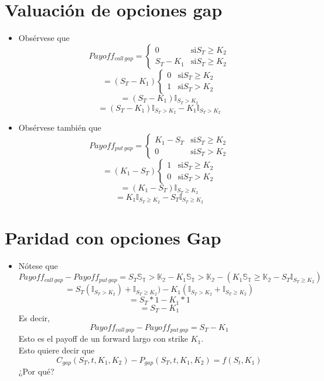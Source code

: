 \documentclass[12pts]{extarticle}
\begin{document}
\section{Valuación de opciones gap}
\begin{itemize}
\item Obsérvese que 
$$Payoff_{call \, gap}=\begin{cases} 0 & \mbox{si} S_T\geq K_2 \\ 
                                        S_T-K_1 & \mbox{si} S_T\geq K_2 \end{cases} $$
$$=(S_T-K_1)\begin{cases} 0 & \mbox{si} S_T\geq K_2 \\ 
                                              1 & \mbox{si} S_T>K_2 \end{cases}$$
$$=(S_T-K_1)\mathbb{I}_{S_T>K_2}$$
$$=(S_T-K_1)\mathbb{I}_{S_T>K_2}-K_1 \mathbb{I}_{S_T>K_2}$$
\item Obsérvese también que
$$Payoff_{put \, gap}=\begin{cases} K_1-S_T & \mbox{si} S_T\geq K_2 \\ 
                                        0 & \mbox{si} S_T>K_2 \end{cases} $$
$$=(K_1-S_T)\begin{cases} 1 & \mbox{si} S_T\geq K_2 \\ 
                                              0 & \mbox{si} S_T>K_2 \end{cases}$$
$$=(K_1-S_T)\mathbb{I}_{S_T\geq K_2}$$
$$=K_1\mathbb{I}_{S_T\geq K_2}-S_T\mathbb{I}_{S_T\geq K_2}$$

\end{itemize}
\section{Paridad con opciones Gap}
\begin{itemize}
\item Nótese que 
$$Payoff_{call \, gap}-Payoff_{put \, gap}=S_T\mathbb{S_T>K_2}-K_1\mathbb{S_T>K_2}-(K_1\mathbb{S_T\geq K_2}-S_T\mathbb{I}_{S_T\geq K_2})$$
$$=S_T(\mathbb{I}_{S_T>K_2})+\mathbb{I}_{S_T \geq K_2})-K_1(\mathbb{I}_{S_T>K_2}+\mathbb{I}_{S_T \geq K_2})$$
$$=S_T*1-K_1*1$$
$$=S_T-K_1$$
Es decir,
$$Payoff_{call \, gap}-Payoff_{put \, gap}=S_T-K_1$$
Esto es el payoff de un forward largo con strike $K_1$. \\
Esto quiere decir que 
$$C_{gap}(S_T,t,K_1,K_2)-P_{gap}(S_T,t,K_1,K_2)=f(S_t,K_1)$$
¿Por qué? 
\end{itemize}
\end{document}

